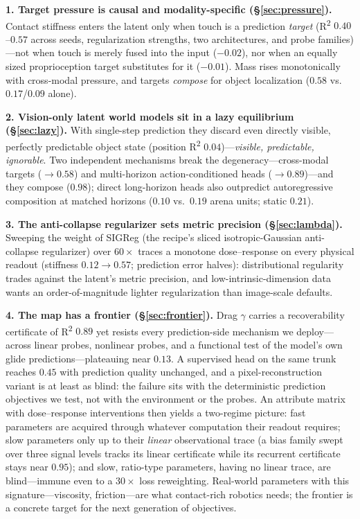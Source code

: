 \documentclass{article} %
\begin{document}
\textbf{1. Target pressure is causal and modality-specific
(\S\ref{sec:pressure}).} Contact stiffness enters the latent only when touch is a
prediction \emph{target} (R\textsuperscript{2} $0.40$--$0.57$ across seeds,
regularization strengths, two architectures, and probe families)---not when
touch is merely fused into the input ($-0.02$), nor when an equally sized
proprioception target substitutes for it ($-0.01$). Mass rises monotonically
with cross-modal pressure, and targets \emph{compose} for object localization
($0.58$ vs.\ $0.17$/$0.09$ alone).

\textbf{2. Vision-only latent world models sit in a lazy equilibrium
(\S\ref{sec:lazy}).} With single-step prediction they discard even directly
visible, perfectly predictable object state (position R\textsuperscript{2}
$0.04$)---\emph{visible, predictable, ignorable}. Two independent mechanisms
break the degeneracy---cross-modal targets ($\rightarrow 0.58$) and
multi-horizon action-conditioned heads ($\rightarrow 0.89$)---and they compose
($0.98$); direct long-horizon heads also outpredict autoregressive composition
at matched horizons ($0.10$ vs.\ $0.19$ arena units; static $0.21$).

\textbf{3. The anti-collapse regularizer sets metric precision
(\S\ref{sec:lambda}).} Sweeping the weight of SIGReg (the recipe's sliced
isotropic-Gaussian anti-collapse regularizer) over $60\times$ traces a
monotone dose--response on every physical readout (stiffness $0.12 \rightarrow
0.57$; prediction error halves): distributional regularity trades against the
latent's metric precision, and low-intrinsic-dimension data wants an
order-of-magnitude lighter regularization than image-scale defaults.

\textbf{4. The map has a frontier (\S\ref{sec:frontier}).} Drag $\gamma$ carries a
recoverability certificate of R\textsuperscript{2} $0.89$ yet resists every
prediction-side mechanism we deploy---across linear probes, nonlinear probes, and
a functional test of the model's own glide predictions---plateauing near $0.13$.
A supervised head on the same trunk reaches $0.45$ with prediction
quality unchanged, and a pixel-reconstruction variant is at least as blind:
the failure sits with the deterministic prediction objectives we test, not
with the environment or the probes. An attribute matrix with dose--response
interventions then yields a two-regime picture: fast parameters are acquired
through whatever computation their readout requires; slow parameters only up
to their \emph{linear} observational trace (a bias family swept over three
signal levels tracks its linear certificate while its recurrent certificate
stays near $0.95$); and slow, ratio-type parameters, having no linear trace,
are blind---immune even to a $30\times$ loss reweighting.
Real-world parameters with this signature---viscosity, friction---are what
contact-rich robotics needs; the frontier is a concrete target for the next
generation of objectives.
\end{document}
